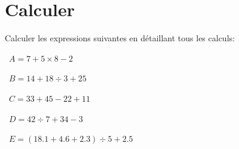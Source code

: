 
\section{Calculer}
Calculer les expressions suivantes en détaillant tous les calculs:
\begin{questions}
	
	
	\question[4]  $A = 7 + 5 \times 8 - 2$
	
	\fillwithdottedlines{6cm}
	
	\question[4]  $B = 14 + 18 \div 3 + 25$
	
	\fillwithdottedlines{6cm}
	
	\newpage
	
	\question[4]  $C = 33 + 45 - 22 + 11$
	
	\fillwithdottedlines{6cm}
	
	
	
	\question[4]  $D = 42 \div 7 + 34 - 3$
	
	\fillwithdottedlines{6cm}
	
	\question[4]  $E = (\num{18.1} + \num{4.6} + \num{2.3}) \div 5 + \num{2.5}$
	
	\fillwithdottedlines{6cm}
	
\end{questions}


